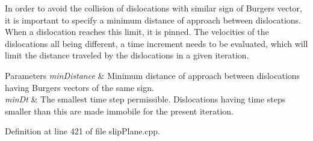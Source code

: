 In order to avoid the collision of dislocations with similar sign of Burgers vector, it is important to specify a minimum distance of approach between dislocations. When a dislocation reaches this limit, it is pinned. The velocities of the dislocations all being different, a time increment needs to be evaluated, which will limit the distance traveled by the dislocations in a given iteration. 
\begin{DoxyParams}{Parameters}
{\em min\-Distance} & Minimum distance of approach between dislocations having Burgers vectors of the same sign. \\
\hline
{\em min\-Dt} & The smallest time step permissible. Dislocations having time steps smaller than this are made immobile for the present iteration. \\
\hline
\end{DoxyParams}


Definition at line 421 of file slip\-Plane.\-cpp.


